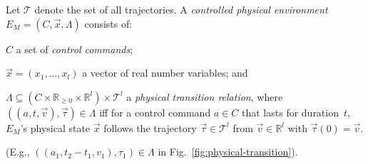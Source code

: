 \begin{definition}
Let  $\mathcal{T}$ denote the set of all trajectories. 
A \emph{controlled physical environment} $E_M = (C, \vec{x}, \Lambda)$ consists of:
\begin{inparaenum}[(i)]
    \item $C$ a set of \emph{control commands}; %
    \item $\vec{x} = (x_1, \ldots,x_l)$ a vector of real number variables; and
    \item $\Lambda \subseteq (C \times \mathbb{R}_{\geq 0} \times \mathbb{R}^l) \times \mathcal{T}^l$
    a \emph{physical transition relation}, where
    $((a, t, \vec{v}),  \vec{\tau}) \in \Lambda$
    iff for a control command $a \in C$ that lasts 
    for duration~$t$, 
    $E_M$'s physical state $\vec{x}$ follows the trajectory 
    $\vec{\tau} \in \mathcal{T}^l$
    from $\vec{v} \in \mathbb{R}^l$ with
        $\vec{\tau}(0) = \vec{v}$.
\end{inparaenum}
(E.g., $((a_1,t_2-t_1,v_1), \tau_1) \in \Lambda$ in Fig.~\ref{fig:physical-transition}).
\end{definition}

